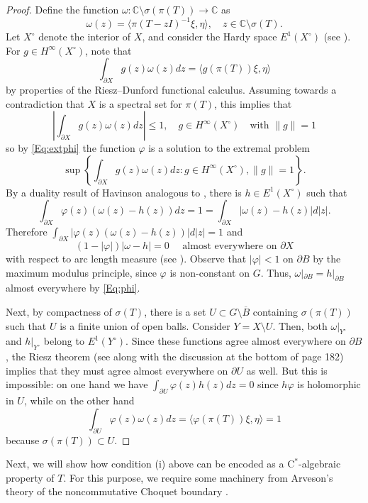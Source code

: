 \documentclass[10pt]{amsart}
\newcommand{\bC}{{\mathbb{C}}}
\newcommand{\rC}{\mathrm{C}}
\renewcommand{\phi}{\varphi}
\newcommand{\ol}{\overline}
\theoremstyle{definition}
\begin{document}
\begin{proof}
Define the function $\omega:\bC\setminus \sigma(\pi(T))\to \bC$ as
\[
\omega(z)=\langle \pi(T-zI)^{-1}\xi,\eta\rangle, \quad z\in \bC\setminus \sigma(T).
\]
Let $X^\circ$ denote the interior of $X$, and consider the Hardy space $E^1(X^\circ)$ (see \cite[Chapter 10]{duren1970}).
For $g\in H^\infty(X^\circ)$, note that
\[
 \int_{\partial X} g(z) \omega(z) dz=\langle g(\pi(T))\xi,\eta\rangle
\]
by properties of the Riesz--Dunford functional calculus. Assuming towards a contradiction that $X$ is a spectral set for $\pi(T)$, this implies that 
\[
\left|  \int_{\partial X} g(z) \omega(z) dz\right|\leq 1, \quad g\in H^\infty(X^\circ) \quad \text{with } \|g\|= 1
\]
so by \eqref{Eq:extphi} the function $\phi$ is a solution to the extremal problem
\[
\sup\left\{  \int_{\partial X} g(z) \omega(z) dz: g\in H^\infty(X^\circ), \|g\|=1\right\}.
\]
By a duality result of Havinson \cite{havinson1957} analogous to \cite[Section 8.1]{duren1970}, there is $h\in E^1(X^\circ)$ such that
 \[
 \int_{\partial X}\phi(z)(\omega(z)-h(z))dz=1=\int_{\partial X}|\omega(z)-h(z)|d|z|.
 \]
 Therefore $\int_{\partial X}|\phi(z)(\omega(z)-h(z))|d|z|=1$ and
 \begin{equation}\label{Eq:phi}
  (1-|\phi|)|\omega-h|=0 \quad \text{ almost everywhere on } \partial X
 \end{equation}
 with respect to arc length measure (see  \cite[Theorem 5]{williams1967}). Observe that $|\phi|<1$ on $\partial B$ by the maximum modulus principle, since $\phi$ is non-constant on $G$. Thus, $\omega|_{\partial B}=h|_{\partial B}$ almost everywhere by \eqref{Eq:phi}. 
 
 Next, by compactness of $\sigma(T)$, there is a set $U\subset G\setminus \ol{B}$ containing $\sigma(\pi(T))$ such that $U$ is a finite union of open balls. Consider $Y=X\setminus U$. Then, both $\omega|_{Y^\circ}$ and $h|_{Y^\circ}$ belong to $E^1(Y^\circ)$. Since these functions agree almost everywhere on $\partial B$, the Riesz theorem (see \cite[Theorem 10.3]{duren1970} along with the discussion at the bottom of page 182) implies that they must agree almost everywhere on $\partial U$ as well. But this is impossible: on one hand we have
$
\int_{\partial U}\phi(z)h(z)dz=0
$ since $h\phi$ is holomorphic in  $U$, while on the other hand 
\[
\int_{\partial U}\phi(z)\omega(z)dz=\langle \phi(\pi(T))\xi,\eta\rangle=1
\]
because $\sigma(\pi(T))\subset U$.
\end{proof}




Next, we will show how condition (i) above can be encoded as a $\rC^*$-algebraic property of $T$. For this purpose, we require some machinery from Arveson's theory of the noncommutative Choquet boundary \cite{arveson1969}.  
\end{document}
